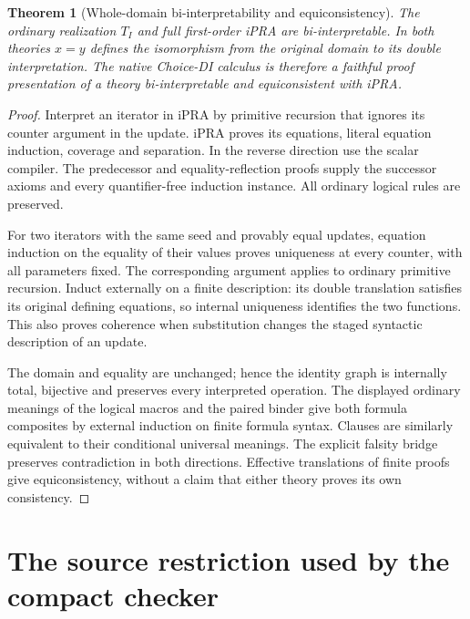 \documentclass[11pt,a4paper]{article}
\newtheorem{theorem}{Theorem}[section]
\theoremstyle{definition}\newtheorem{definition}[theorem]{Definition}
\begin{document}
\begin{theorem}[Whole-domain bi-interpretability and equiconsistency]
The ordinary realization $T_I$ and full first-order iPRA are
bi-interpretable. In both theories $x=y$ defines the isomorphism from
the original domain to its double interpretation. The native Choice-DI
calculus is therefore a faithful proof presentation of a theory
bi-interpretable and equiconsistent with iPRA.
\end{theorem}
\begin{proof}
Interpret an iterator in iPRA by primitive recursion that ignores its
counter argument in the update. iPRA proves its equations, literal
equation induction, coverage and separation. In the reverse direction
use the scalar compiler. The predecessor and equality-reflection proofs
supply the successor axioms and every quantifier-free induction instance.
All ordinary logical rules are preserved.

For two iterators with the same seed and provably equal updates,
equation induction on the equality of their values proves uniqueness at
every counter, with all parameters fixed. The corresponding argument
applies to ordinary primitive recursion. Induct externally on a finite
description: its double translation satisfies its original defining
equations, so internal uniqueness identifies the two functions. This
also proves coherence when substitution changes the staged syntactic
description of an update.

The domain and equality are unchanged; hence the identity graph is
internally total, bijective and preserves every interpreted operation.
The displayed ordinary meanings of the logical macros and the paired
binder give both formula composites by external induction on finite
formula syntax. Clauses are similarly equivalent to their conditional
universal meanings. The explicit falsity bridge preserves contradiction
in both directions. Effective translations of finite proofs give
equiconsistency, without a claim that either theory proves its own
consistency.
\end{proof}


\clearpage
\part{The source restriction used by the compact checker}

\end{document}
